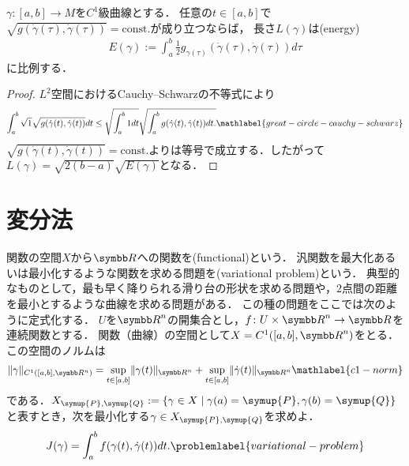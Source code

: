 \documentclass{ltjsarticle}
\begin{document}
\begin{thmbox}
\begin{proposition}
\(\gamma \colon [a, b] \to M\)を\(C^1\)級曲線とする．
任意の\(t \in [a, b]\)で\(\sqrt{g(\dot{\gamma}(\tau), \dot{\gamma}(\tau))} = \mathrm{const.}\)が成り立つならば，
長さ\(L(\gamma)\)は(energy)
\begin{align*}
    E(\gamma) := \int_{a}^{b} \frac{1}{2} g_{\gamma(\tau)}(\dot{\gamma}(\tau), \dot{\gamma}(\tau)) d\tau
\end{align*}
に比例する．
\end{proposition}
\end{thmbox}

\begin{proof}
\(L^2\)空間におけるCauchy--Schwarzの不等式により
\begin{gather}
    \int_{a}^{b} \sqrt{1} \sqrt{g(\dot{\gamma}(t), \dot{\gamma}(t))} dt
    \leq
    \sqrt{\int_a^b 1 dt}
    \sqrt{%
        \int_{a}^{b} g(\dot{\gamma}(t), \dot{\gamma}(t)) dt.
    }
    \mathlabel{great-circle-cauchy-schwarz}
\end{gather}
\(\sqrt{g(\dot{\gamma}(t), \dot{\gamma}(t))} = \mathrm{const.}\)よりは等号で成立する．したがって\(L(\gamma) = \sqrt{2 (b - a)}\sqrt{E(\gamma)} \)となる．
\end{proof}


\section{変分法}
関数の空間\(X\)から\({\Real}\)への関数を(functional)という．
汎関数を最大化あるいは最小化するような関数を求める問題を(variational problem)という．
典型的なものとして，最も早く降りられる滑り台の形状を求める問題や，\(2\)点間の距離を最小とするような曲線を求める問題がある．
この種の問題をここでは次のように定式化する．
\(U\)を\({\Real}^n\)の開集合とし，\(f \colon U \times {\Real}^n \to {\Real}\)を連続関数とする．
関数（曲線）の空間として\(X = C^1([a, b], {\Real}^n)\)をとる．
この空間のノルムは
\begin{align}
    \lVert \gamma \rVert_{C^1([a, b], {\Real}^n)} =
    \sup_{t \in [a, b]} \lVert \gamma(t) \rVert_{{\Real}^n} + \sup_{t \in [a, b]} \lVert \dot{\gamma}(t) \rVert_{{\Real}^n}
    \mathlabel{c1-norm}
\end{align}
である．\(X_{\symup{P}, \symup{Q}} := \{\gamma \in X \mid \gamma(a) = \symup{P}, \gamma(b) = \symup{Q}\}\)と表すとき，次を最小化する\(\gamma \in X_{\symup{P}, \symup{Q}}\)を求めよ．
\begin{align}
    J(\gamma) = \int_a^b f(\gamma(t), \dot{\gamma}(t))dt. \problemlabel{variational-problem}
\end{align}
\end{document}
